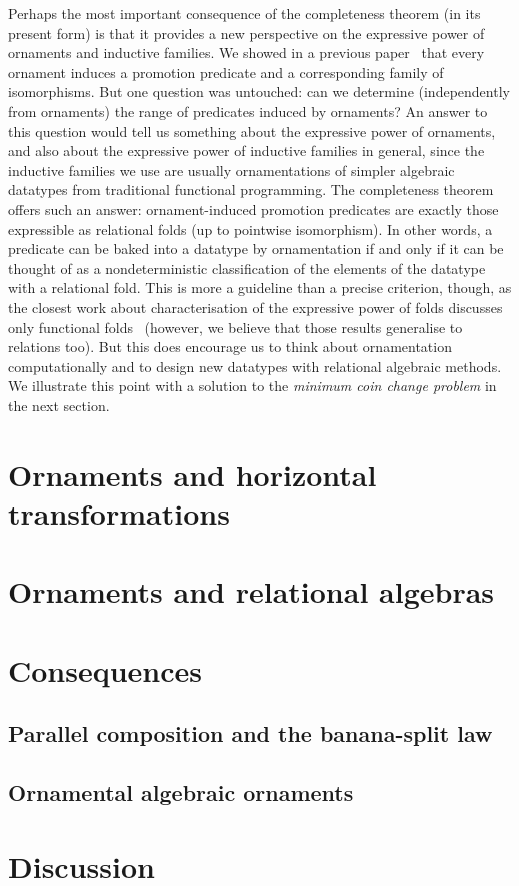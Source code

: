 Perhaps the most important consequence of the completeness theorem (in its present form) is that it provides a new perspective on the expressive power of ornaments and inductive families.
We showed in a previous paper~\cite{Ko-pcOrn} that every ornament induces a promotion predicate and a corresponding family of isomorphisms.
But one question was untouched: can we determine (independently from ornaments) the range of predicates induced by ornaments?
An answer to this question would tell us something about the expressive power of ornaments, and also about the expressive power of inductive families in general, since the inductive families we use are usually ornamentations of simpler algebraic datatypes from traditional functional programming.
The completeness theorem offers such an answer: ornament-induced promotion predicates are exactly those expressible as relational folds (up to pointwise isomorphism).
In other words, a predicate can be baked into a datatype by ornamentation if and only if it can be thought of as a nondeterministic classification of the elements of the datatype with a relational fold.
This is more a guideline than a precise criterion, though, as the closest work about characterisation of the expressive power of folds discusses only functional folds~\cite{Gibbons-kernels}
(however, we believe that those results generalise to relations too).
But this does encourage us to think about ornamentation computationally and to design new datatypes with relational algebraic methods.
We illustrate this point with a solution to the \emph{minimum coin change problem} in the next section.

\section{Ornaments and horizontal transformations}

\section{Ornaments and relational algebras}

\section{Consequences}

\subsection{Parallel composition and the banana-split law}


\subsection{Ornamental algebraic ornaments}

\section{Discussion}

